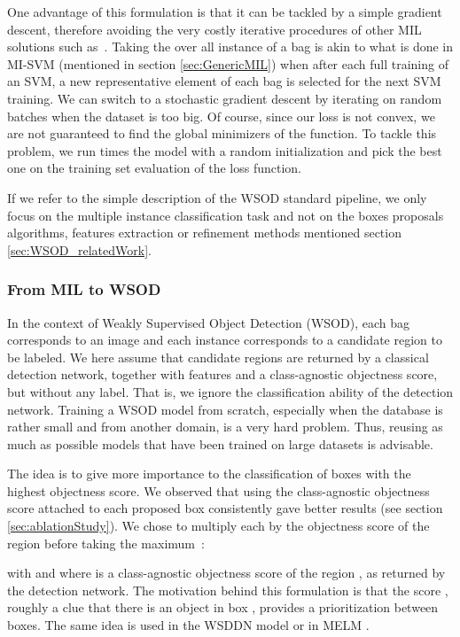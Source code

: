 \documentclass[preprint]{elsarticle}
\begin{document}
 One advantage of this formulation is that it can be tackled by a simple gradient descent, therefore avoiding the very costly iterative procedures of other MIL solutions such as~\cite{andrews_support_2003}. Taking the  over all instance of a bag is akin to what is done in MI-SVM (mentioned in section \ref{sec:GenericMIL}) when after each full training of an SVM, a new representative element of each bag is selected for the next SVM training.
We can switch to a stochastic gradient descent by iterating on random batches when the dataset is too big.  Of course, since our loss is not convex, we are not guaranteed to find the global minimizers of the function. To tackle this problem, we run  times the model with a random initialization and pick the best one on the training set evaluation of the loss function. 

 If we refer to the simple description of the WSOD standard pipeline, we only focus on the multiple instance classification task and not on the boxes proposals algorithms, features extraction or refinement methods mentioned section \ref{sec:WSOD_relatedWork}.



 

\subsubsection{From MIL to WSOD} \label{sec:objectTrick} 


In the context of Weakly Supervised Object Detection (WSOD), each bag  corresponds to an image and each instance  corresponds to a candidate region to be labeled. We here assume that candidate regions are returned by a classical detection network, together with features and a class-agnostic objectness score, but without any label. That is, we ignore the classification ability of the detection network. 
Training a WSOD model from scratch, especially when the database is rather small and from another domain, is a very hard problem. Thus, reusing as much as possible models that have been trained on large datasets is advisable.


The idea is to give more importance to the classification of boxes with the highest objectness score. We observed that using the class-agnostic objectness score attached to each proposed box consistently gave better results (see section \ref{sec:ablationStudy}).  We chose to multiply each  by the objectness score of the region  before taking the maximum~:


with  and where  is a class-agnostic objectness score of the region , as returned by the detection network. 
The motivation behind this formulation is that the score , roughly a  clue that there is an object in box , provides a prioritization between boxes. The same idea is used in the WSDDN model \cite{bilen_weakly_2016} or in MELM \cite{wan_minentropy_2018}. 
\end{document}
